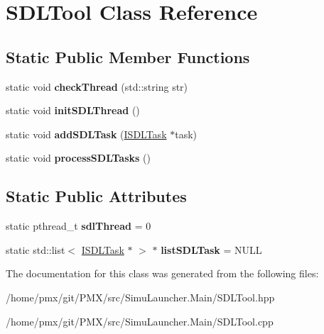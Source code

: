 \hypertarget{classSDLTool}{}\section{S\+D\+L\+Tool Class Reference}
\label{classSDLTool}
\subsection*{Static Public Member Functions}
\begin{DoxyCompactItemize}
\item 
\mbox{\label{classSDLTool_ab423a03ba8fc3b9b82a49746a5ced5ac}} 
static void {\bfseries check\+Thread} (std\+::string str)
\item 
\mbox{\label{classSDLTool_a57e489533d05ec5a610982aa15e30402}} 
static void {\bfseries init\+S\+D\+L\+Thread} ()
\item 
\mbox{\label{classSDLTool_a2b8b30467d2db779438b9cc4638005e3}} 
static void {\bfseries add\+S\+D\+L\+Task} (\hyperlink{classISDLTask}{I\+S\+D\+L\+Task} $\ast$task)
\item 
\mbox{\label{classSDLTool_afb5bbaf18f96defa3654e8b0134b19e2}} 
static void {\bfseries process\+S\+D\+L\+Tasks} ()
\end{DoxyCompactItemize}
\subsection*{Static Public Attributes}
\begin{DoxyCompactItemize}
\item 
\mbox{\label{classSDLTool_ae3258c58357e91ccf161bc6f1a4e99d3}} 
static pthread\+\_\+t {\bfseries sdl\+Thread} = 0
\item 
\mbox{\label{classSDLTool_a72bc92d997012952cca52a8598c4652f}} 
static std\+::list$<$ \hyperlink{classISDLTask}{I\+S\+D\+L\+Task} $\ast$ $>$ $\ast$ {\bfseries list\+S\+D\+L\+Task} = N\+U\+LL
\end{DoxyCompactItemize}


The documentation for this class was generated from the following files\+:\begin{DoxyCompactItemize}
\item 
/home/pmx/git/\+P\+M\+X/src/\+Simu\+Launcher.\+Main/S\+D\+L\+Tool.\+hpp\item 
/home/pmx/git/\+P\+M\+X/src/\+Simu\+Launcher.\+Main/S\+D\+L\+Tool.\+cpp\end{DoxyCompactItemize}
